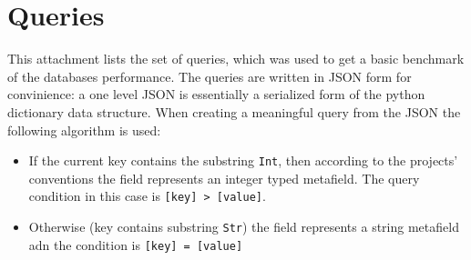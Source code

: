 \chapter{Queries} \label{app:queries}

This attachment lists the set of queries, which was used to get a basic benchmark of the databases performance.
The queries are written in JSON form for convinience: a one level JSON is essentially a serialized form of the 
python dictionary data structure. When creating a meaningful query from the JSON the following algorithm is used:

\begin{itemize}
	\item If the current key contains the substring \texttt{Int}, then according to the projects' 
		conventions the field represents an integer typed metafield. The query condition in this case is 
		\texttt{[key] > [value]}.
	\item Otherwise (key contains substring \texttt{Str}) the field represents a string metafield adn the condition
		is \texttt{[key] = [value]}	
\end{itemize}


